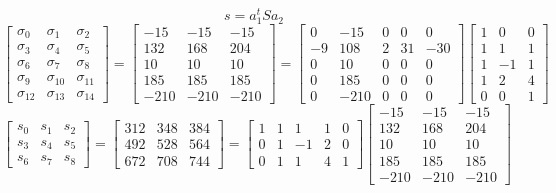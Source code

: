 \documentclass{article}%
\begin{document}
\[%
s = a_1^t S a_2%
\]%
\[%
\left[\begin{matrix}\sigma_{0} & \sigma_{1} & \sigma_{2}\\\sigma_{3} & \sigma_{4} & \sigma_{5}\\\sigma_{6} & \sigma_{7} & \sigma_{8}\\\sigma_{9} & \sigma_{10} & \sigma_{11}\\\sigma_{12} & \sigma_{13} & \sigma_{14}\end{matrix}\right] = \left[\begin{matrix}-15 & -15 & -15\\132 & 168 & 204\\10 & 10 & 10\\185 & 185 & 185\\-210 & -210 & -210\end{matrix}\right] = \left[\begin{matrix}0 & -15 & 0 & 0 & 0\\-9 & 108 & 2 & 31 & -30\\0 & 10 & 0 & 0 & 0\\0 & 185 & 0 & 0 & 0\\0 & -210 & 0 & 0 & 0\end{matrix}\right] \left[\begin{matrix}1 & 0 & 0\\1 & 1 & 1\\1 & -1 & 1\\1 & 2 & 4\\0 & 0 & 1\end{matrix}\right]%
\]%
\[%
\left[\begin{matrix}s_{0} & s_{1} & s_{2}\\s_{3} & s_{4} & s_{5}\\s_{6} & s_{7} & s_{8}\end{matrix}\right] = \left[\begin{matrix}312 & 348 & 384\\492 & 528 & 564\\672 & 708 & 744\end{matrix}\right] = \left[\begin{matrix}1 & 1 & 1 & 1 & 0\\0 & 1 & -1 & 2 & 0\\0 & 1 & 1 & 4 & 1\end{matrix}\right] \left[\begin{matrix}-15 & -15 & -15\\132 & 168 & 204\\10 & 10 & 10\\185 & 185 & 185\\-210 & -210 & -210\end{matrix}\right]%
\]%
\end{document}
